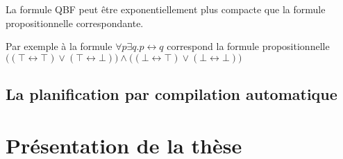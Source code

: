 La formule QBF peut être exponentiellement plus compacte que la formule propositionnelle correspondante. 

Par exemple à la formule $\forall p \exists q.p \leftrightarrow q$ correspond la formule propositionnelle \\
$\Big ( (\top \leftrightarrow \top)\vee (\top \leftrightarrow \bot) \Big ) \wedge \Big ( (\bot \leftrightarrow \top)\vee (\bot \leftrightarrow \bot) \Big )$

\subsection{La planification par compilation automatique}


\section{Présentation de la thèse}
